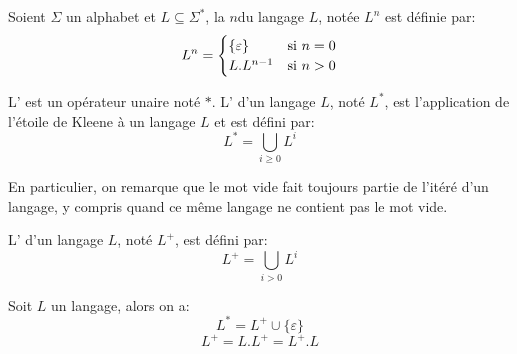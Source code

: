 \begin{definition}
	Soient \( \Sigma \) un alphabet et \( L \subseteq \Sigma^* \), la  \( n \)\ieme du langage \( L \), notée \( L^n \) est définie par:
	\[
		L^n =
		\begin{cases}
			\{ \varepsilon \} & \text{si \( n = 0\)} \\
			L . L^{n-1}       & \text{si \( n > 0\)}
		\end{cases}
	\]
\end{definition}


\begin{definition}
	L' est un opérateur unaire noté \( * \). L' d'un langage \( L \), noté \( L^* \), est l'application de l'étoile de Kleene à un langage \( L \) et est défini par:
	\begin{equation}
		L^* = \bigcup_{i \geq 0} L^i
	\end{equation}
\end{definition}

En particulier, on remarque que le mot vide fait toujours partie de l'itéré d'un langage, y compris quand ce même langage ne contient pas le mot vide.

\begin{definition}
	L' d'un langage \( L \), noté \( L^+ \), est défini par:
	\begin{equation}
		L^+ = \bigcup_{i > 0} L^i
	\end{equation}
\end{definition}

\begin{proposition}
	Soit \( L \) un langage, alors on a:
	\begin{equation}
		L^* = L^+ \cup \{ \varepsilon \}
	\end{equation}
	\begin{equation}
		L^+ = L.L^+ = L^+.L
	\end{equation}
\end{proposition}

